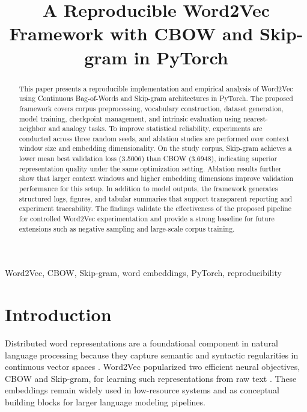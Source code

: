 \documentclass[conference]{IEEEtran}
\begin{document}
\title{A Reproducible Word2Vec Framework with CBOW and Skip-gram in PyTorch}

\author{
}

\maketitle

\begin{abstract}
This paper presents a reproducible implementation and empirical analysis of Word2Vec using Continuous Bag-of-Words and Skip-gram architectures in PyTorch. The proposed framework covers corpus preprocessing, vocabulary construction, dataset generation, model training, checkpoint management, and intrinsic evaluation using nearest-neighbor and analogy tasks. To improve statistical reliability, experiments are conducted across three random seeds, and ablation studies are performed over context window size and embedding dimensionality. On the study corpus, Skip-gram achieves a lower mean best validation loss (3.5006) than CBOW (3.6948), indicating superior representation quality under the same optimization setting. Ablation results further show that larger context windows and higher embedding dimensions improve validation performance for this setup. In addition to model outputs, the framework generates structured logs, figures, and tabular summaries that support transparent reporting and experiment traceability. The findings validate the effectiveness of the proposed pipeline for controlled Word2Vec experimentation and provide a strong baseline for future extensions such as negative sampling and large-scale corpus training.
\end{abstract}

\begin{IEEEkeywords}
Word2Vec, CBOW, Skip-gram, word embeddings, PyTorch, reproducibility
\end{IEEEkeywords}

\section{Introduction}
Distributed word representations are a foundational component in natural language processing because they capture semantic and syntactic regularities in continuous vector spaces \cite{b1,b10,b21}. Word2Vec popularized two efficient neural objectives, CBOW and Skip-gram, for learning such representations from raw text \cite{b20,b21}. These embeddings remain widely used in low-resource systems and as conceptual building blocks for larger language modeling pipelines.
\end{document}
